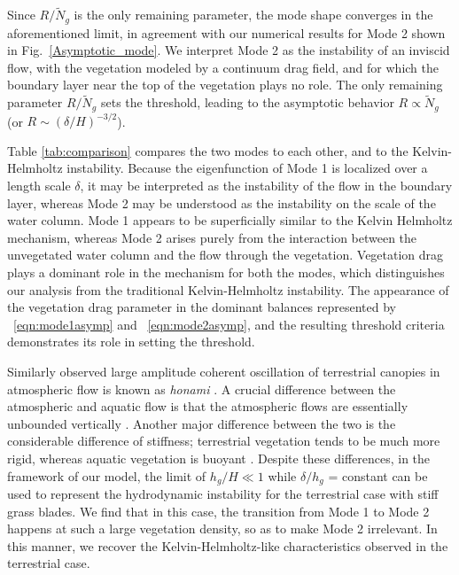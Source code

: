 \documentclass[aps,preprint,12pt]{revtex4-1}  %
\newcommand{\hg}{h_g}
\newcommand{\Rey}{{R}}
\newcommand{\Ndg}{\tilde{N}_g}
\begin{document}
Since $\Rey/\Ndg$ is the only remaining parameter, the mode shape converges in the aforementioned limit, in agreement with our numerical results for Mode 2 shown in Fig.~\ref{Asymptotic_mode}. 
We interpret Mode 2 as the instability of an inviscid flow, with the vegetation modeled by a continuum drag field, and for which the boundary layer near the top of the vegetation plays no role. The only remaining parameter $\Rey/\Ndg$ 
sets the threshold, leading to the asymptotic behavior $\Rey \propto \Ndg$ (or $\Rey \sim ({\delta}/{H})^{-3/2}$).

Table \ref{tab:comparison} compares the two modes to each other, and to the Kelvin-Helmholtz instability. 
Because the eigenfunction of Mode 1 is localized over a length scale $\delta$, it may be interpreted as the instability of the flow in the boundary layer, whereas Mode 2 may be understood as the instability on the scale of the water column. 
Mode 1 appears to be superficially similar to the Kelvin Helmholtz mechanism, whereas Mode 2 arises purely from the interaction between the unvegetated water column and the flow through the vegetation. 
Vegetation drag plays a dominant role in the mechanism for both the modes, which distinguishes our analysis from the traditional Kelvin-Helmholtz instability. 
The appearance of the vegetation drag parameter in the dominant balances represented by ~\eqref{eqn:mode1asymp} and ~\eqref{eqn:mode2asymp}, and the resulting threshold criteria demonstrates its role in setting the threshold.

Similarly observed large amplitude coherent oscillation of terrestrial canopies in atmospheric flow is known as \textit{honami} \cite{Inoue56,Raupach96}.
A crucial difference between the atmospheric and aquatic flow is that the atmospheric flows are essentially unbounded vertically \cite{Vivoni98,Nepf00}. 
Another major difference between the two is the considerable difference of stiffness; terrestrial vegetation tends to be much more rigid, whereas aquatic vegetation is buoyant \cite{Vivoni98,Ghisal02}. 
Despite these differences, in the framework of our model, the limit of $\hg/H \ll 1$ while $\delta/\hg$ = constant can be used to represent the hydrodynamic instability for the terrestrial case with stiff grass blades. We find that in this case, the transition from Mode 1 to Mode 2 happens at such a large vegetation density, so as to make Mode 2 irrelevant. In this manner, we recover the Kelvin-Helmholtz-like characteristics observed in the terrestrial case. 
\end{document}
